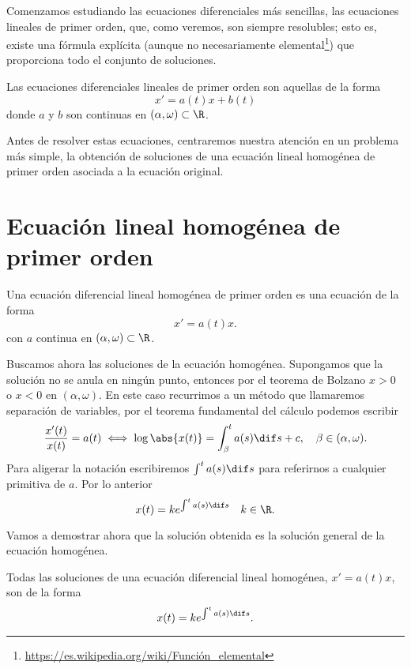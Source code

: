 \documentclass[../ecuaciones_diferenciales.tex]{subfiles}
\begin{document}
Comenzamos estudiando las ecuaciones diferenciales más sencillas, las ecuaciones
lineales de primer orden, que, como veremos, son siempre resolubles; esto es,
existe una fórmula explícita (aunque no necesariamente
elemental\footnote{\url{https://es.wikipedia.org/wiki/Función_elemental}}) que
proporciona todo el conjunto de soluciones.

\begin{definition}
	Las ecuaciones diferenciales lineales de primer orden son aquellas de la forma
	\[x' = a(t)x + b(t)\]
	donde \(a\) y \(b\) son continuas en \((\alpha, \omega) \subset \R\).
\end{definition}

Antes de resolver estas ecuaciones, centraremos nuestra atención en un problema
más simple, la obtención de soluciones de una ecuación lineal homogénea de
primer orden asociada a la ecuación original.

\section{Ecuación lineal homogénea de primer orden} \label{sec:hom}

\begin{definition}
	Una ecuación diferencial lineal homogénea de primer orden es una ecuación de la
	forma
	\[x' = a(t)x.\]
	con \(a\) continua en \((\alpha, \omega) \subset \R\).
\end{definition}

Buscamos ahora las soluciones de la ecuación homogénea. Supongamos que la
solución no se anula en ningún punto, entonces por el teorema de Bolzano
\(x > 0\) o \(x < 0\) en \((\alpha, \omega)\). En este caso recurrimos a un
método que llamaremos separación de variables, por el teorema fundamental del
cálculo podemos escribir
\[\frac{x'(t)}{x(t)} = a(t) \iff \log\abs{x(t)}
	= \int_{\beta}^t a(s) \dif s + c,
	\quad \beta \in (\alpha, \omega).\]
Para aligerar la notación escribiremos \(\int^t a(s) \dif s\) para referirnos
a cualquier primitiva de \(a\). Por lo anterior
\[x(t) = k e^{\int^t a(s) \dif s} \quad k \in \R.\]

Vamos a demostrar ahora que la solución obtenida es la solución general de la
ecuación homogénea.

\begin{theorem}
	Todas las soluciones de una ecuación diferencial lineal homogénea,
	\(x' = a(t)x\), son de la forma
	\begin{equation}
		x(t) = k e^{\int^t a(s) \dif s}. \label{eq:sol_gen}
	\end{equation}
\end{theorem}
\end{document}
